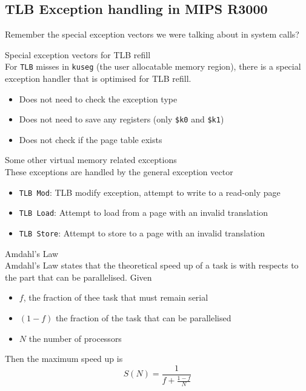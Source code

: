 \documentclass[journal, letterpaper]{IEEEtran}
\begin{document}
\subsection{TLB Exception handling in MIPS R3000}
Remember the special exception vectors we were talking about in system calls?
\begin{aside}{Special exception vectors for TLB refill} \\
    For \verb|TLB| misses in \verb|kuseg| (the user allocatable memory region), there is a special exception handler that is optimised for TLB refill.
    \begin{itemize}
        \item Does not need to check the exception type
        \item Does not need to save any registers (only \verb|$k0| and \verb|$k1|)
        \item Does not check if the page table exists
    \end{itemize}
\end{aside}
\begin{example}{Some other virtual memory related exceptions} \\
    These exceptions are handled by the general exception vector
    \begin{itemize}
        \item \verb|TLB Mod|: TLB modify exception, attempt to write to a read-only page
        \item \verb|TLB Load|: Attempt to load from a page with an invalid translation
        \item \verb|TLB Store|: Attempt to store to a page with an invalid translation
    \end{itemize}
\end{example}
\begin{theory}{Amdahl's Law} \\
    Amdahl's Law states that the theoretical speed up of a task is with respects to the part that can be parallelised. Given
    \begin{itemize}
        \item $f$, the fraction of thee task that must remain serial
        \item $(1 - f)$ the fraction of the task that can be parallelised
        \item $N$ the number of processors
    \end{itemize}
    Then the maximum speed up is
    $$ S(N) = \frac{1}{f + \frac{1-f}{N}}$$
\end{theory}
\end{document}
